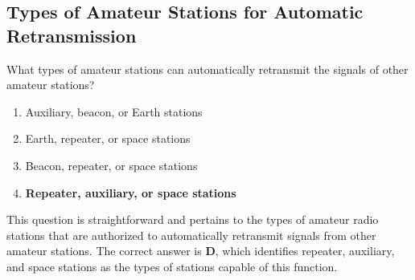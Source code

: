 \subsection{Types of Amateur Stations for Automatic Retransmission}
\label{T1D07}

\begin{tcolorbox}[colback=gray!10!white,colframe=black!75!black,title=T1D07]
What types of amateur stations can automatically retransmit the signals of other amateur stations?
\begin{enumerate}[label=\Alph*,noitemsep]
    \item Auxiliary, beacon, or Earth stations
    \item Earth, repeater, or space stations
    \item Beacon, repeater, or space stations
    \item \textbf{Repeater, auxiliary, or space stations}
\end{enumerate}
\end{tcolorbox}

This question is straightforward and pertains to the types of amateur radio stations that are authorized to automatically retransmit signals from other amateur stations. The correct answer is \textbf{D}, which identifies repeater, auxiliary, and space stations as the types of stations capable of this function.